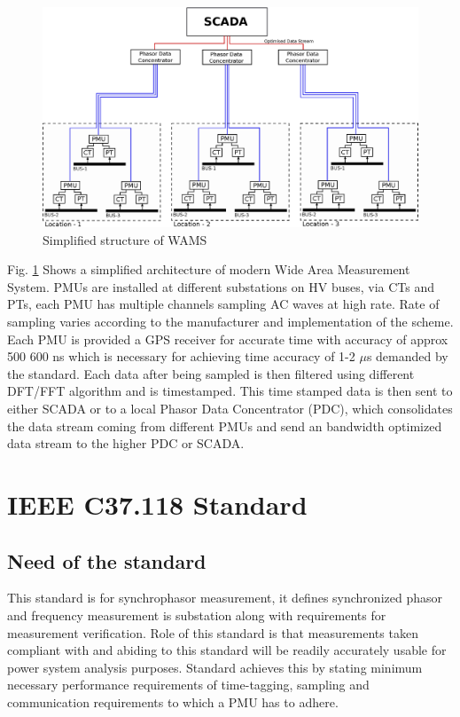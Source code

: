 \begin{figure}
	\includegraphics[width=\textwidth]{fig/wams.eps}
	\caption{Simplified structure of WAMS}
	\label{fig:wams}
\end{figure}

Fig. \ref{fig:wams} Shows a simplified architecture of modern Wide Area Measurement System. PMUs are installed at different substations on HV buses, via CTs and PTs, each PMU has multiple channels sampling AC waves at high rate. Rate of sampling varies according to the manufacturer and implementation of the scheme. Each PMU is provided a GPS receiver for accurate time with accuracy of approx 500 600 ns which is necessary for achieving time accuracy of 1-2 $\mu$s demanded by the standard. Each data after being sampled is then filtered using different DFT/FFT algorithm and is timestamped. This time stamped data is then sent to either SCADA or to a local Phasor Data Concentrator (PDC), which consolidates the data stream coming from different PMUs and send an bandwidth optimized data stream to the higher PDC or SCADA. 

\section{IEEE C37.118 Standard}

\subsection{Need of the standard}
This standard is for synchrophasor measurement, it defines synchronized phasor and frequency measurement is substation along with requirements for measurement verification. Role of this standard is that measurements taken compliant with and abiding to this standard will be readily accurately usable for power system analysis purposes. Standard achieves this by stating minimum necessary performance requirements of time-tagging, sampling and communication requirements to which a PMU has to adhere.

